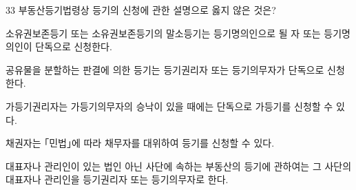 \begin{question}{33}
부동산등기법령상 등기의 신청에 관한 설명으로 옳지 않은 것은?
\begin{choices}
  \item 소유권보존등기 또는 소유권보존등기의 말소등기는 등기명의인으로 될 자 또는 등기명의인이 단독으로 신청한다.
  \item 공유물을 분할하는 판결에 의한 등기는 등기권리자 또는 등기의무자가 단독으로 신청한다.
  \item 가등기권리자는 가등기의무자의 승낙이 있을 때에는 단독으로 가등기를 신청할 수 있다.
  \item 채권자는 ｢민법｣에 따라 채무자를 대위하여 등기를 신청할 수 있다.
  \item 대표자나 관리인이 있는 법인 아닌 사단에 속하는 부동산의 등기에 관하여는 그 사단의 대표자나 관리인을 등기권리자 또는 등기의무자로 한다.
\end{choices}
\end{question}

